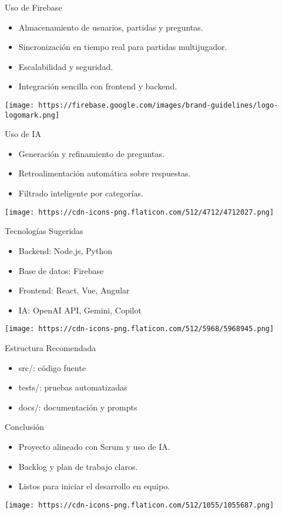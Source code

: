 \documentclass{beamer}
\begin{document}
\begin{frame}{Uso de Firebase}
  \begin{itemize}
    \item Almacenamiento de usuarios, partidas y preguntas.
    \item Sincronización en tiempo real para partidas multijugador.
    \item Escalabilidad y seguridad.
    \item Integración sencilla con frontend y backend.
  \end{itemize}
  \texttt{[image: https://firebase.google.com/images/brand-guidelines/logo-logomark.png]}
\end{frame}

\begin{frame}{Uso de IA}
  \begin{itemize}
    \item Generación y refinamiento de preguntas.
    \item Retroalimentación automática sobre respuestas.
    \item Filtrado inteligente por categorías.
  \end{itemize}
  \texttt{[image: https://cdn-icons-png.flaticon.com/512/4712/4712027.png]}
\end{frame}

\begin{frame}{Tecnologías Sugeridas}
  \begin{itemize}
    \item Backend: Node.js, Python
    \item Base de datos: Firebase
    \item Frontend: React, Vue, Angular
    \item IA: OpenAI API, Gemini, Copilot
  \end{itemize}
  \texttt{[image: https://cdn-icons-png.flaticon.com/512/5968/5968945.png]}
\end{frame}

\begin{frame}{Estructura Recomendada}
  \begin{itemize}
    \item src/: código fuente
    \item tests/: pruebas automatizadas
    \item docs/: documentación y prompts
  \end{itemize}
\end{frame}

\begin{frame}{Conclusión}
  \begin{itemize}
    \item Proyecto alineado con Scrum y uso de IA.
    \item Backlog y plan de trabajo claros.
    \item Listos para iniciar el desarrollo en equipo.
  \end{itemize}
  \texttt{[image: https://cdn-icons-png.flaticon.com/512/1055/1055687.png]}
\end{frame}
\end{document}
